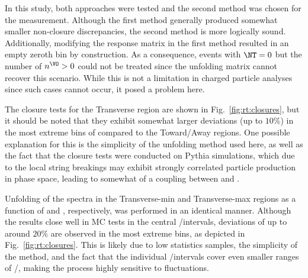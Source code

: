 In this study, both approaches were tested and the second method was chosen for the measurement. Although the first method generally produced somewhat smaller non-closure discrepancies, the second method is more logically sound. Additionally, modifying the response matrix in the first method resulted in an empty zeroth bin by construction. As a consequence, events with $\NT = 0$ but the number of \VOs $n^{\VO}>0$ could not be treated since the unfolding matrix cannot recover this scenario. While this is not a limitation in charged particle analyses since such cases cannot occur, it posed a problem here.

The closure tests for the Transverse region are shown in Fig.~\ref{fig:rt:closures}, but it should be noted that they exhibit somewhat larger deviations (up to $10\%$) in the most extreme bins of \RT compared to the Toward/Away regions. One possible explanation for this is the simplicity of the unfolding method used here, as well as the fact that the closure tests were conducted on Pythia simulations, which due to the local string breakings may exhibit strongly correlated particle production in phase space, leading to somewhat of a coupling between \NT and \VOs.

Unfolding of the \VOs spectra in the Transverse-min and Transverse-max regions as a function of \NTmin and \NTmax, respectively, was performed in an identical manner. Although the results close well in MC tests in the central \RTmin/\RTmax intervals, deviations of up to around $20\%$ are observed in the most extreme bins, as depicted in Fig.~\ref{fig:rt:closures}. This is likely due to low statistics samples, the simplicity of the method, and the fact that the individual \RTmin/\RTmax intervals cover even smaller ranges of \NTmin/\NTmax, making the process highly sensitive to fluctuations.


